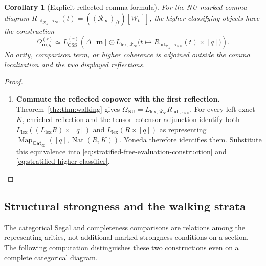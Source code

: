 \documentclass[oneside]{article}
\theoremstyle{plain}
\newtheorem{corollary}[theorem]{Corollary}
\theoremstyle{definition}
\theoremstyle{remark}
\newcommand{\Cat}{\mathbf{Cat}_{\infty}}
\newcommand{\Map}{\operatorname{Map}}
\newcommand{\NU}{\mathrm{NU}}
\newcommand{\Nat}{\operatorname{Nat}}
\newcommand{\RNU}{\mathcal R_{\infty}}
\newcommand{\id}{\operatorname{id}}
\begin{document}
\begin{corollary}[Explicit reflected-comma formula]
\label{cor:stratified-higher-explicit}
For the NU marked comma diagram
$R_{\id_{\RNU},\tau_{\NU}}(t)
 =((\RNU)_{/t})[W_t^{-1}]$,
the higher classifying objects have the construction
\begin{equation}\label{eq:stratified-higher-explicit}
 \Omega^{(r)}_{\mathbf m,q}
 \simeq
 L_{\mathrm{CSS}}^{(r)}\!\left(
 \Delta[\mathbf m]\odot
 L_{\mathrm{lex},\RNU}
 \bigl(t\mapsto R_{\id_{\RNU},\tau_{\NU}}(t)\times[q]\bigr)
 \right).
\end{equation}
No arity, comparison term, or higher coherence is adjoined outside the
comma localization and the two displayed reflections.
\end{corollary}
\begin{proof}
\leavevmode
\begin{enumerate}
\item \textbf{Commute the reflected copower with the first reflection.}
Theorem~\ref{thz:thm:walking} gives
$\Omega_{\NU}=L_{\mathrm{lex},\RNU}R_{\id,\tau_{\NU}}$.
For every left-exact $K$, enriched reflection and the tensor--cotensor
adjunction identify both
$L_{\mathrm{lex}}((L_{\mathrm{lex}}R)\times[q])$
and $L_{\mathrm{lex}}(R\times[q])$ as representing
$\Map_{\Cat}([q],\Nat(R,K))$.  Yoneda therefore identifies them.
Substitute this equivalence into
\eqref{eq:stratified-free-evaluation-construction} and
\eqref{eq:stratified-higher-classifier}.\qedhere
\end{enumerate}
\end{proof}

\subsection{Structural strongness and the walking strata}
\label{subsec:stratified-strongness}

The categorical Segal and completeness comparisons are relations among
the representing arities, not additional marked-strongness conditions
on a section.  The following computation distinguishes these two
constructions even on a complete categorical diagram.
\end{document}

